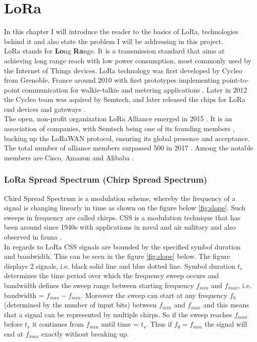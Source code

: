 \chapter{LoRa}

In this chapter I will introduce the reader to the 
basics of LoRa, technologies behind it and also state
the problem I will be addressing in this project.\\

LoRa stands for \textbf{Lo}ng \textbf{Ra}nge. It is a transmission standard that aims at achieving long range reach with low power consumption, most commonly used by the Internet of Things devices. LoRa technology was first developed by Cycleo from Grenoble, France around 2010 with first prototypes implementing point-to-point communication for walkie-talkie and metering applications \cite{trinity_panel}. Later in 2012 the Cycleo team was aquired by Semtech, and later released the chips for LoRa end devices and gateways \cite{origins}. \\

The open, non-profit organization LoRa Alliance emerged in 2015 \cite{alliance}. It is an association of companies, with Semtech being one of its founding members \cite{alliance_founder}, backing up the LoRaWAN protocol, ensuring its global presence and acceptance. The total number of alliance members surpassed 500 in 2017 \cite{500_members}. Among the notable members are Cisco, Amazon and Alibaba \cite{alliance_members}. 

\subsection{LoRa Spread Spectrum (Chirp Spread Spectrum)}


Chird Spread Spectrum is a modulation scheme, whereby the frequency of a signal is changing linearly in time \cite{ieee_2007} as shown on the figure below \ref{fig:slope}. Such sweeps in frequency are called chirps. CSS is a modulation technique that has been around since 1940s
\cite{semtech_spec} with applications in naval and air military and also observed in fauna \cite{origins}.\\

In regards to LoRa CSS signals are bounded by the specified symbol duration and bandwidth. This can be seen in the figure \ref{fig:slope} below. The figure displays 2 signals, i.e. black solid line and blue dotted line. Symbol duration $t_s$ determines the time period over which the frequency sweep occurs and bandwidth defines the sweep range between starting frequency $f_{min}$ and $f_{max}$, i.e. bandwidth = $f_{max} - f_{min}$. Moreover the sweep can start at any frequency $f_0$ (determined by the number of input bits) between $f_{min}$ and $f_{max}$ and this means that a signal can be represented by multiple chirps. So if the sweep reaches $f_{max}$ before $t_s$ it 
continues from $f_{min}$ until time = $t_s$. Thus if $f_0 = f_{min}$
the signal will end at $f_{max}$ exactly without breaking up. 

